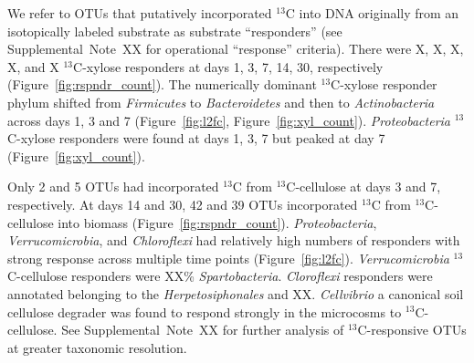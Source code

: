 We refer to OTUs that putatively incorporated $^{13}$C into DNA originally from
an isotopically labeled substrate as  substrate ``responders'' (see
Supplemental~Note~XX for operational ``response'' criteria). There were X, X,
X, X, and X $^{13}$C-xylose responders at days 1, 3, 7, 14, 30, respectively
(Figure~\ref{fig:rspndr_count}).
The numerically dominant $^{13}$C-xylose responder phylum shifted from
\textit{Firmicutes} to \textit{Bacteroidetes} and then to
\textit{Actinobacteria} across days 1, 3 and 7 (Figure~\ref{fig:l2fc},
Figure~\ref{fig:xyl_count}). \textit{Proteobacteria} $^{13}$C-xylose responders
were found at days 1, 3, 7 but peaked at day 7 (Figure~\ref{fig:xyl_count}). 

Only 2 and 5 OTUs had incorporated $^{13}$C from
$^{13}$C-cellulose at days 3 and 7, respectively. At days 14 and 30,
42 and 39 OTUs incorporated $^{13}$C from $^{13}$C-cellulose into
biomass (Figure~\ref{fig:rspndr_count}). 
\textit{Proteobacteria}, \textit{Verrucomicrobia}, and \textit{Chloroflexi} had
relatively high numbers of responders with strong response across multiple time
points (Figure~\ref{fig:l2fc}). \textit{Verrucomicrobia} $^{13}$C-cellulose
responders were XX\% \textit{Spartobacteria}. \textit{Cloroflexi} responders
were annotated belonging to the \textit{Herpetosiphonales} and XX.
\textit{Cellvibrio} a canonical soil cellulose degrader was found to respond
strongly in the microcosms to $^{13}$C-cellulose. See Supplemental~Note~XX for
further analysis of $^{13}$C-responsive OTUs at greater taxonomic resolution.

